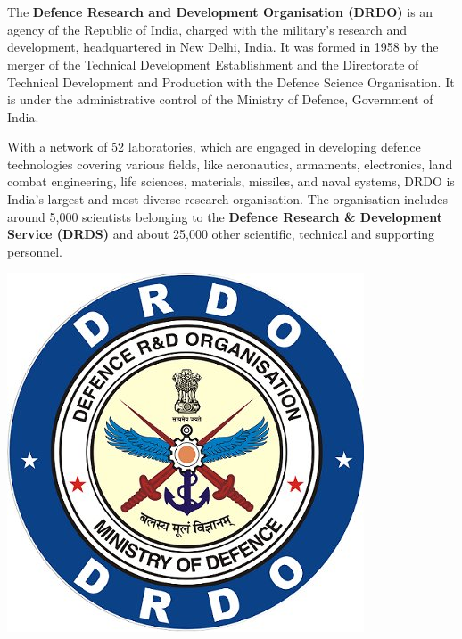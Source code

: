\documentclass[14pt]{article} %
\date{}
\date{\vspace{-30pt}}
\begin{document}

\thispagestyle{plain}
\section*{\LARGE\bfseries{\\ }}
   The \textbf{Defence Research and Development Organisation (DRDO)} is an agency of the Republic of India, charged with the military's research and development, headquartered in New Delhi, India. It was formed in 1958 by the merger of the Technical Development Establishment and the Directorate of Technical Development and Production with the Defence Science Organisation. It is under the administrative control of the Ministry of Defence, Government of India.\\
   \par           With a network of 52 laboratories, which are engaged in developing defence technologies covering various fields, like aeronautics, armaments, electronics, land combat engineering, life sciences, materials, missiles, and naval systems, DRDO is India's largest and most diverse research organisation. The organisation includes around 5,000 scientists belonging to the \textbf{Defence Research \& Development Service (DRDS)} and about 25,000 other scientific, technical and supporting personnel.\vspace{1em}

\centerline{\includegraphics[width=0.3\linewidth]{drdo.jpg}}
\vspace{0.5em}
\end{document}
